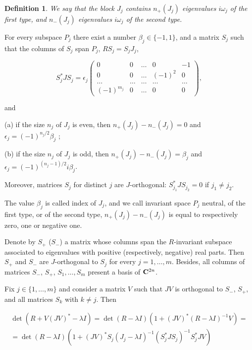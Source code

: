 \documentclass[11pt, reqno]{amsart}
\theoremstyle{plain}
\newtheorem{definition}[theorem]{Definition}
\begin{document}
\begin{definition} We say that the block $J_{j}$ contains $n_{+}(J_{j})$ eigenvalues $i\omega_{j}$ of the first type, and $n_{-}(J_{j})$ eigenvalues $i\omega_{j}$ of the second type.
\end{definition}

For every subspace $P_{j}$ there exist a number $\beta_{j}\in\{-1,1\}$, and a matrix $S_{j}$ such that the columns of $S_{j}$ span $P_{j}$, $RS_{j}=S_{j}J_{j}$, 

$$ S_{j}^{*}JS_{j} = \epsilon_{j} \left(\begin{array}{ccccc} 0 & 0 & \ldots & 0 & -1 \\
0 & 0 & \ldots & (-1)^{2} & 0 \\  \ldots &  \ldots &  \ldots &  \ldots &  \ldots \\ (-1)^{m_{j}} & 0 & \ldots & 0 & 0 \end{array}\right),
$$

\noindent and

(a) if the size $n_{j}$ of $J_{j}$ is even, then $n_{+}(J_{j})-n_{-}(J_{j})=0$ and $\epsilon_{j}=(-1)^{n_{j}/2}\beta_{j}$ ;

(b) if the size $n_{j}$ of $J_{j}$ is odd, then $n_{+}(J_{j})-n_{-}(J_{j})=\beta_{j}$ and $\epsilon_{j}=(-1)^{(n_{j}-1)/2}i\beta_{j}$.

\noindent Moreover, matrices $S_{j}$ for distinct $j$ are $J$-orthogonal: $S_{j_{1}}^{*}JS_{j_{2}}=0$ if $j_{1}\ne j_{2}$.

The value $\beta_{j}$ is called index of $J_{j}$, and we call invariant space $P_{j}$ neutral, of the first type, or of the second type, $n_{+}(J_{j})-n_{-}(J_{j})$ is equal to respectively zero, one or negative one.

Denote by $S_{+}$ ($S_{-}$) a matrix whose columns span the $R$-invariant subspace associated to eigenvalues with positive (respectively, negative) real parts. Then $S_{+}$ and $S_{-}$ are $J$-orthogonal to $S_{j}$ for every $j=1,\ldots,m$. Besides, all columns of matrices $S_{-}$, $S_{+}$, $S_{1},\ldots,S_{m}$ present a basis of ${\bf C}^{2n}$.

Fix $j\in \{1,\ldots,m\}$ and consider a matrix $V$ such that $JV$ is orthogonal to $S_{-}$, $S_{+}$, and all matrices $S_{k}$ with $k\ne j$. Then 

$$ \begin{array}{c} \det(R + V(JV)^{*} -\lambda I)=\det(R-\lambda I) (1+(JV)^{*}(R-\lambda I)^{-1}V)= \\
= \det(R-\lambda I) (1+(JV)^{*}S_{j}(J_{j}-\lambda I)^{-1}(S_{j}^{*}JS_{j})^{-1}S_{j}^{*}JV)
\end{array}
$$
\end{document}
